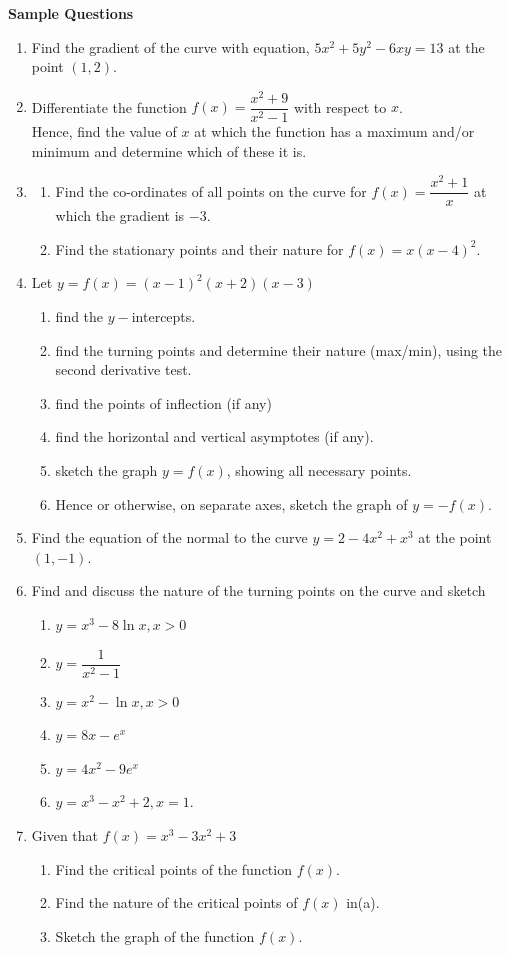 \documentclass[11pt,a4paper]{article}
\begin{document}
\textbf{Sample Questions}
\begin{enumerate}
\item Find the gradient of the curve with equation, $5x^2+5y^2-6xy=13$ at the point $(1,2)$.
\item Differentiate the function $f(x)=\dfrac{x^2+9}{x^2-1}$ with respect to $x$.\\ Hence, find the value of $x$ at which the function has a maximum and/or minimum and determine which of these it is.
\item
\begin{enumerate}
      \item Find the co-ordinates of all points on the curve for $f(x)=\dfrac{x^2+1}{x}$ at which the gradient is $-3$.
      \item Find the stationary points and their nature for $f(x)=x(x-4)^2$.
\end{enumerate}
\item Let $y=f(x)=(x-1)^2(x+2)(x-3)$
\begin{enumerate}
       \item find the $y-$intercepts.
       \item find the turning points and determine their nature (max/min), using the second derivative test.
       \item find the points of inflection (if any)
       \item find the horizontal and vertical asymptotes (if any).
       \item sketch the graph $y=f(x)$, showing all necessary points.
       \item Hence or otherwise, on separate axes, sketch the graph of $y=-f(x)$.
\end{enumerate}
\item Find the equation of the normal to the curve $y=2-4x^2+x^3$ at the point $(1,-1)$.
\item Find and discuss the nature of the turning points on the curve and sketch
\begin{enumerate}
      \item $y=x^3-8\ln x, x>0$
      \item $y=\dfrac{1}{x^2-1}$
      \item $y=x^2-\ln x, x>0$
      \item $y=8x-e^x$
      \item $y=4x^2-9e^x$
      \item $y=x^3-x^2+2, x=1.$
\end{enumerate}
\item Given that $f(x)=x^3-3x^2+3$
\begin{enumerate}
      \item Find the critical points of the function $f(x)$.
      \item Find the nature of the critical points of $f(x)$ in(a).
      \item Sketch the graph of the function $f(x)$.\\
\end{enumerate}
\end{enumerate}
\end{document}
